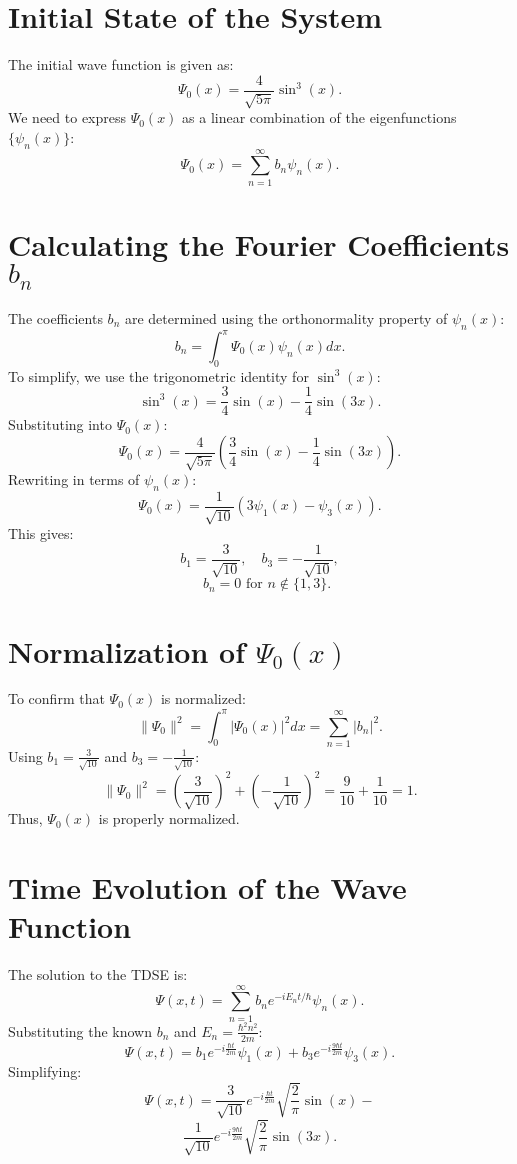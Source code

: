 \documentclass[a4paper,12pt]{article}
\begin{document}
\begin{multicols}{2}
\section{Initial State of the System}
The initial wave function is given as:
\[
\Psi_0(x) = \frac{4}{\sqrt{5\pi}} \sin^3(x).
\]
We need to express $\Psi_0(x)$ as a linear combination of the eigenfunctions $\{\psi_n(x)\}$:
\[
\Psi_0(x) = \sum_{n=1}^\infty b_n \psi_n(x).
\]

\section{Calculating the Fourier Coefficients $b_n$}
The coefficients $b_n$ are determined using the orthonormality property of $\psi_n(x)$:
\[
b_n = \int_0^\pi \Psi_0(x) \psi_n(x) dx.
\]
To simplify, we use the trigonometric identity for $\sin^3(x)$:
\[
\sin^3(x) = \frac{3}{4}\sin(x) - \frac{1}{4}\sin(3x).
\]
Substituting into $\Psi_0(x)$:
\[
\Psi_0(x) = \frac{4}{\sqrt{5\pi}} \left( \frac{3}{4}\sin(x) - \frac{1}{4}\sin(3x) \right).
\]
Rewriting in terms of $\psi_n(x)$:
\[
\Psi_0(x) = \frac{1}{\sqrt{10}} \left( 3\psi_1(x) - \psi_3(x) \right).
\]
This gives:
\[
b_1 = \frac{3}{\sqrt{10}}, \quad b_3 = -\frac{1}{\sqrt{10}},
\]
\[
\quad b_n = 0 \text{ for } n \notin \{1, 3\}.
\]

\section{Normalization of $\Psi_0(x)$}
To confirm that $\Psi_0(x)$ is normalized:
\[
\|\Psi_0\|^2 = \int_0^\pi |\Psi_0(x)|^2 dx = \sum_{n=1}^\infty |b_n|^2.
\]
Using $b_1 = \frac{3}{\sqrt{10}}$ and $b_3 = -\frac{1}{\sqrt{10}}$:
\[
\|\Psi_0\|^2 = \left( \frac{3}{\sqrt{10}} \right)^2 + \left( -\frac{1}{\sqrt{10}} \right)^2 = \frac{9}{10} + \frac{1}{10} = 1.
\]
Thus, $\Psi_0(x)$ is properly normalized.

\section{Time Evolution of the Wave Function}
The solution to the TDSE is:
\[
\Psi(x,t) = \sum_{n=1}^\infty b_n e^{-iE_n t/\hbar} \psi_n(x).
\]
Substituting the known $b_n$ and $E_n = \frac{\hbar^2 n^2}{2m}$:
\[
\Psi(x,t) = b_1 e^{-i \frac{\hbar t}{2m}} \psi_1(x) + b_3 e^{-i \frac{9\hbar t}{2m}} \psi_3(x).
\]
Simplifying:
\[
\Psi(x,t) = \frac{3}{\sqrt{10}} e^{-i \frac{\hbar t}{2m}} \sqrt{\frac{2}{\pi}} \sin(x) -
\]
\[
\frac{1}{\sqrt{10}} e^{-i \frac{9\hbar t}{2m}} \sqrt{\frac{2}{\pi}} \sin(3x).
\]


\end{multicols}
\end{document}
